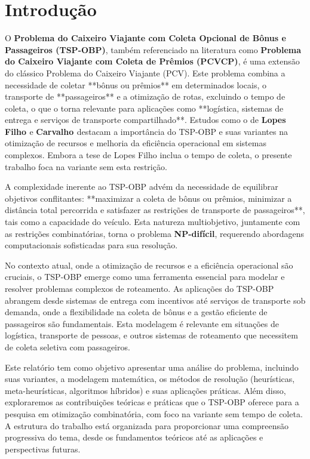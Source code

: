 \documentclass[12pt, a4paper]{report}
\begin{document}

\newpage
\tableofcontents
\thispagestyle{empty}
\newpage
\setcounter{page}{1}
\pagestyle{plain}


\section*{Introdução}

O \textbf{Problema do Caixeiro Viajante com Coleta Opcional de Bônus e Passageiros (TSP-OBP)}, também referenciado na literatura como \textbf{Problema do Caixeiro Viajante com Coleta de Prêmios (PCVCP)}, é uma extensão do clássico Problema do Caixeiro Viajante (PCV). Este problema combina a necessidade de coletar **bônus ou prêmios** em determinados locais, o transporte de **passageiros** e a otimização de rotas, excluindo o tempo de coleta, o que o torna relevante para aplicações como **logística, sistemas de entrega e serviços de transporte compartilhado**. Estudos como o de \textbf{Lopes Filho \cite{lopesfilho2019}} e \textbf{Carvalho \cite{carvalho2022}} destacam a importância do TSP-OBP e suas variantes na otimização de recursos e melhoria da eficiência operacional em sistemas complexos. Embora a tese de Lopes Filho \cite{lopesfilho2019} inclua o tempo de coleta, o presente trabalho foca na variante sem esta restrição.

A complexidade inerente ao TSP-OBP advém da necessidade de equilibrar objetivos conflitantes: **maximizar a coleta de bônus ou prêmios, minimizar a distância total percorrida e satisfazer as restrições de transporte de passageiros**, tais como a capacidade do veículo. Esta natureza multiobjetivo, juntamente com as restrições combinatórias, torna o problema \textbf{NP-difícil}, requerendo abordagens computacionais sofisticadas para sua resolução.

No contexto atual, onde a otimização de recursos e a eficiência operacional são cruciais, o TSP-OBP emerge como uma ferramenta essencial para modelar e resolver problemas complexos de roteamento. As aplicações do TSP-OBP abrangem desde sistemas de entrega com incentivos até serviços de transporte sob demanda, onde a flexibilidade na coleta de bônus e a gestão eficiente de passageiros são fundamentais. Esta modelagem é relevante em situações de logística, transporte de pessoas,  e outros sistemas de roteamento que necessitem de coleta seletiva com passageiros.

Este relatório tem como objetivo apresentar uma análise do problema, incluindo suas variantes, a modelagem matemática, os métodos de resolução (heurísticas, meta-heurísticas, algoritmos híbridos) e suas aplicações práticas. Além disso, exploraremos as contribuições teóricas e práticas que o TSP-OBP oferece para a pesquisa em otimização combinatória, com foco na variante sem tempo de coleta. A estrutura do trabalho está organizada para proporcionar uma compreensão progressiva do tema, desde os fundamentos teóricos até as aplicações e perspectivas futuras.
\end{document}
